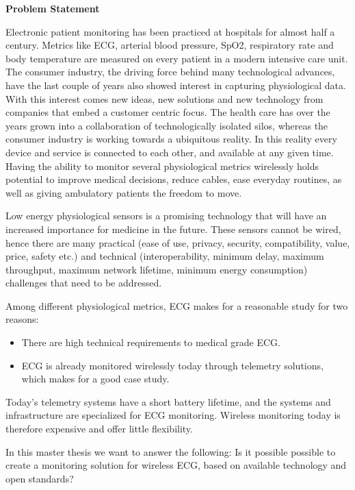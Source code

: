 \noindent
\textbf{Problem Statement} 
\newline 
	
\noindent 
Electronic patient monitoring has been practiced at hospitals for almost half a century. Metrics like ECG, arterial blood pressure, SpO2, respiratory rate and body temperature are measured on every patient in a modern intensive care unit. The consumer industry, the driving force behind many technological advances, have the last couple of years also showed interest in capturing physiological data. With this interest comes new ideas, new solutions and new technology from companies that embed a customer centric focus. The health care has over the years grown into a collaboration of technologically isolated silos, whereas the consumer industry is working towards a ubiquitous reality. In this reality every device and service is connected to each other, and available at any given time. Having the ability to monitor several physiological metrics wirelessly holds potential to improve medical decisions, reduce cables, ease everyday routines, as well as giving ambulatory patients the freedom to move. 
	
	Low energy physiological sensors is a promising technology that will have an increased importance for medicine in the future. These sensors cannot be wired, hence there are many practical (ease of use, privacy, security, compatibility, value, price, safety etc.) and technical (interoperability, minimum delay, maximum throughput, maximum network lifetime, minimum energy consumption) challenges that need to be addressed.
	
	Among different physiological metrics, ECG makes for a reasonable study for two reasons: 
	\begin{itemize}
		\item There are high technical requirements to medical grade ECG. 
		\item ECG is already monitored wirelessly today through telemetry solutions, which makes for a good case study. 
	\end{itemize}

\noindent	
Today's telemetry systems have a short battery lifetime, and the systems and infrastructure are specialized for ECG monitoring. Wireless monitoring today is therefore expensive and offer little flexibility. 

In this master thesis we want to answer the following: Is it possible possible to create a monitoring solution for wireless ECG, based on available technology and open standards?